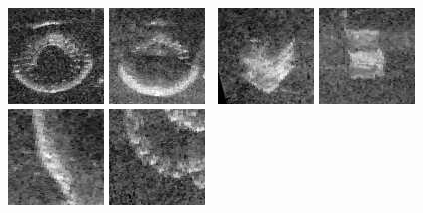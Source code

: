 \begin{figure}
{{			\includegraphics[width=0.11 \textwidth]{chapters/images/matching/match70446-A.jpg}
			\includegraphics[width=0.11 \textwidth]{chapters/images/matching/match70446-B.jpg} $\;$
			\includegraphics[width=0.11 \textwidth]{chapters/images/matching/match125700-A.jpg}
			\includegraphics[width=0.11 \textwidth]{chapters/images/matching/match125700-B.jpg} $\;$
			\includegraphics[width=0.11 \textwidth]{chapters/images/matching/match127401-A.jpg}
			\includegraphics[width=0.11 \textwidth]{chapters/images/matching/match127401-B.jpg}
		}	
	}


\end{figure}
